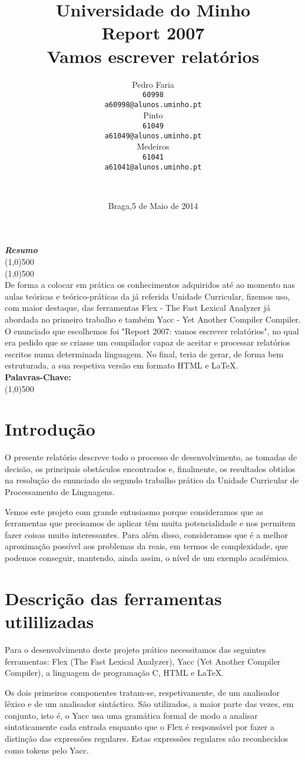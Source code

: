 \documentclass[12pt,letterpaper]{article}
\author{Pedro Faria\\\texttt{60998}\\\texttt{a60998@alunos.uminho.pt}\\\andMiguel Pinto\\\texttt{61049}\\\texttt{a61049@alunos.uminho.pt}\\\andMariana Medeiros\\\texttt{61041}\\\texttt{a61041@alunos.uminho.pt}\\\and\\\vspace*{2.0in}
}\title{ Universidade do Minho\\\vspace*{0.60in}Report 2007\\{\small Vamos escrever relatórios}\vspace*{1.55in}}\date{Braga,5 de Maio de 2014}
\makeatletter
\newenvironment{resumo}
{
\begin{center}
\begin{minipage}[t]{500 pt}
\vspace{5mm}
\emph{\textbf{Resumo}}
\\[-2mm]
\line(1,0){500}
\\[-4.25 mm]
\line(1,0){500}
\\
}
{
\normalsize
\\[2mm]
\footnotesize\textbf{Palavras-Chave: \footnotesize\@palabras}\\[-2mm]\line(1,0){500}\\[0.5cm]\end{minipage}\end{center}}\lhead{Report 2007 - Vamos escrever relatórios}\rhead{Universidade do Minho}\cfoot{\thepage\ de \pageref{LastPage}}
\makeatother
\begin{document}
\maketitle
\newpage
\tableofcontents
\newpage\listoffigures
\newpage\listoftables
\newpage\begin{resumo}
De forma a colocar em prática os conhecimentos adquiridos até ao momento nas aulas teóricas e teórico-práticas da já referida Unidade Curricular, fizemos uso, com maior destaque, das ferramentas Flex - The Fast Lexical Analyzer já abordada no primeiro trabalho e também Yacc - Yet Another Compiler Compiler. O enunciado que escolhemos foi "Report 2007: vamos escrever relatórios", no qual era pedido que se criasse um compilador capaz de aceitar e processar relatórios escritos numa determinada linguagem. No final, teria de gerar, de forma bem estruturada, a sua respetiva versão em formato HTML e LaTeX.\end{resumo}
\newpage
\section{Introdução}
O presente relatório descreve todo o processo de desenvolvimento, as tomadas de decisão, os principais obstáculos encontrados e, finalmente, os resultados obtidos na resolução do enunciado do segundo trabalho prático da Unidade Curricular de Processamento de Linguagens.

Vemos este projeto com grande entusiasmo porque consideramos que as ferramentas que precisamos de aplicar têm muita potencialidade e nos permitem fazer coisas muito interessantes. Para além disso, consideramos que é a melhor aproximação possível aos problemas da reais, em termos de complexidade, que podemos conseguir, mantendo, ainda assim, o nível de um exemplo académico.

\newpage
\section{Descrição das ferramentas utililizadas}
Para o desenvolvimento deste projeto prático necessitamos das seguintes ferramentas: Flex (The Fast Lexical Analyzer), Yacc (Yet Another Compiler Compiler), a linguagem de programação C,  HTML e LaTeX.

Os dois primeiros componentes tratam-se, respetivamente, de um analisador léxico e de um analisador sintáctico. São utilizados, a maior parte das vezes, em conjunto, isto é, o Yacc usa uma gramática formal de modo a analisar sintaticamente cada entrada enquanto que o Flex é responsável por fazer a distinção das expressões regulares. Estas expressões regulares são reconhecidos como tokens pelo Yacc.
\end{document}
